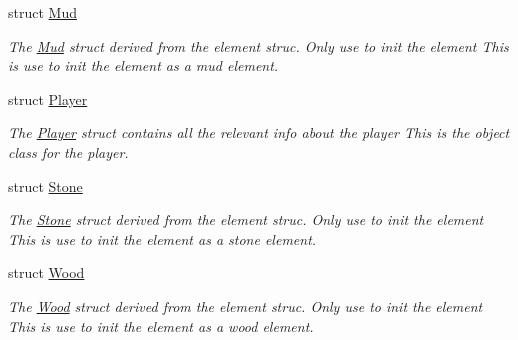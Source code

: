 \begin{DoxyCompactItemize}
struct \hyperlink{structoctet_1_1_mud}{Mud}
\begin{DoxyCompactList}\small\item\em The \hyperlink{structoctet_1_1_mud}{Mud} struct derived from the element struc. Only use to init the element This is use to init the element as a mud element. \end{DoxyCompactList}\item 
struct \hyperlink{structoctet_1_1_player}{Player}
\begin{DoxyCompactList}\small\item\em The \hyperlink{structoctet_1_1_player}{Player} struct contains all the relevant info about the player This is the object class for the player. \end{DoxyCompactList}\item 
struct \hyperlink{structoctet_1_1_stone}{Stone}
\begin{DoxyCompactList}\small\item\em The \hyperlink{structoctet_1_1_stone}{Stone} struct derived from the element struc. Only use to init the element This is use to init the element as a stone element. \end{DoxyCompactList}\item 
struct \hyperlink{structoctet_1_1_wood}{Wood}
\begin{DoxyCompactList}\small\item\em The \hyperlink{structoctet_1_1_wood}{Wood} struct derived from the element struc. Only use to init the element This is use to init the element as a wood element. \end{DoxyCompactList}\end{DoxyCompactItemize}
